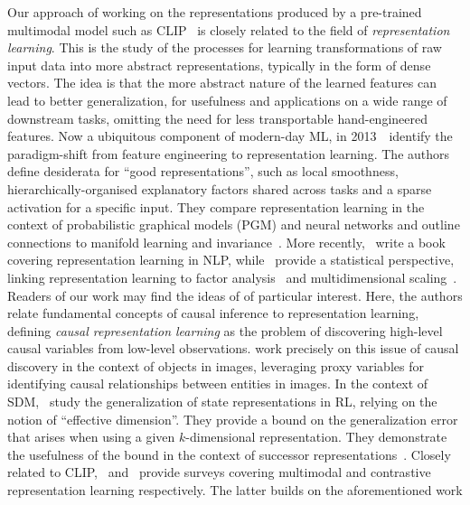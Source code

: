 \documentclass[../main.tex]{subfiles}
\begin{document}
Our approach of working on the representations produced by a pre-trained multimodal model such as
CLIP~\citep{radford_learning_2021} is closely related to the field of \emph{representation
learning}. This is the study of the processes for learning transformations of raw input data into
more abstract representations, typically in the form of dense vectors. The idea is that the more
abstract nature of the learned features can lead to better generalization, for usefulness and
applications on a wide range of downstream tasks, omitting the need for less transportable
hand-engineered features. Now a ubiquitous component of modern-day ML, in
2013~\citeauthor{bengio_representation_2013}~identify the paradigm-shift from feature engineering to
representation learning. The authors define desiderata for ``good representations'', such as local
smoothness, hierarchically-organised explanatory factors shared across tasks and a sparse activation
for a specific input. They compare representation learning in the context of probabilistic graphical
models (PGM) and neural networks and outline connections to manifold learning and
invariance~\citep{bronstein_geometric_2021}. More recently,~\citet{liu_representation_2020} write
a book covering representation learning in NLP, while~\citet{xie_representation_2020} provide
a statistical perspective, linking representation learning to factor analysis~\citep{rubin_em_1982}
and multidimensional scaling~\citep{kruskal_multidimensional_1964}. Readers of our work may find the
ideas of \citet{scholkopf_toward_2021} of particular interest. Here, the authors relate fundamental
concepts of causal inference to representation learning, defining \emph{causal representation
learning} as the problem of discovering high-level causal variables from low-level observations.
\citet{lopez-paz_discovering_2017} work precisely on this issue of causal discovery in the context
of objects in images, leveraging proxy variables for identifying causal relationships between
entities in images. In the context of SDM,~\citet{lan_generalization_2022} study the generalization
of state representations in RL, relying on the notion of ``effective dimension''. They provide
a bound on the generalization error that arises when using a given $k$-dimensional representation.
They demonstrate the usefulness of the bound in the context of successor representations~\citep{dayan_improving_1993}. Closely related to CLIP,~\citet{guo_deep_2019}
and~\citet{le-khac_contrastive_2020} provide surveys covering multimodal and contrastive
representation learning respectively. The latter builds on the aforementioned work
\end{document}
